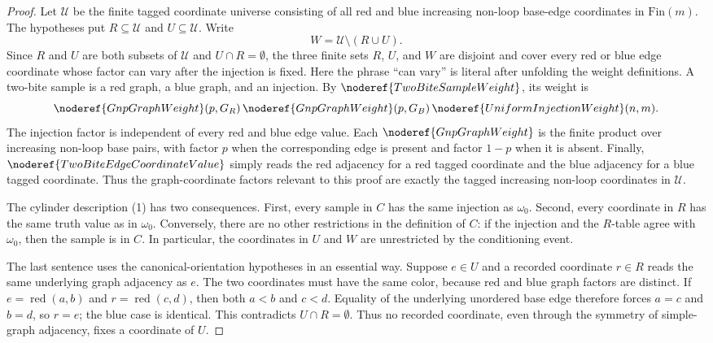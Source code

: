 \begin{proof}
Let \(\mathcal U\) be the finite tagged coordinate universe consisting of all
red and blue increasing non-loop base-edge coordinates in \(\mathrm{Fin}(m)\).
The hypotheses put \(R\subseteq\mathcal U\) and \(U\subseteq\mathcal U\).
Write
\[
W=\mathcal U\setminus(R\cup U).
\]
Since \(R\) and \(U\) are both subsets of \(\mathcal U\) and \(U\cap R=\emptyset\),
the three finite sets \(R\), \(U\), and \(W\) are disjoint and cover every red
or blue edge coordinate whose
 factor can vary after the injection is fixed.
Here the phrase ``can vary'' is literal after unfolding the weight
definitions.  A two-bite sample is a red graph, a blue graph, and an
injection.  By \(\noderef{TwoBiteSampleWeight}\), its weight is
\[
\noderef{GnpGraphWeight}(p,G_R)\,
\noderef{GnpGraphWeight}(p,G_B)\,
\noderef{UniformInjectionWeight}(n,m).
\]
The injection factor is independent of every red and blue edge value.  Each
\(\noderef{GnpGraphWeight}\) is the finite product over increasing non-loop
base pairs, with factor \(p\) when the corresponding edge is present and
factor \(1-p\) when it is absent.  Finally,
\(\noderef{TwoBiteEdgeCoordinateValue}\) simply reads the red adjacency for a
red tagged coordinate and the blue adjacency for a blue tagged coordinate.
Thus the graph-coordinate factors relevant to this proof are exactly the
tagged increasing non-loop coordinates in \(\mathcal U\).

The cylinder description (1) has two consequences.  First, every sample in
\(C\) has the same injection as \(\omega_0\).  Second, every coordinate in
\(R\) has the same truth value as in \(\omega_0\).  Conversely, there are no
other restrictions in the definition of \(C\): if the injection and the
\(R\)-table agree with \(\omega_0\), then the sample is in \(C\).  In
particular, the coordinates in \(U\) and \(W\) are unrestricted by the
conditioning event.

The last sentence uses the canonical-orientation hypotheses in an essential
way.  Suppose \(e\in U\) and a recorded coordinate \(r\in R\) reads the same
underlying graph adjacency as \(e\).  The two coordinates must have the same
color, because red and blue graph factors are distinct.  If
\(e=\operatorname{red}(a,b)\) and \(r=\operatorname{red}(c,d)\), then both
\(a<b\) and \(c<d\).  Equality of the underlying unordered base edge therefore
forces \(a=c\) and \(b=d\), so \(r=e\); the blue case is identical.  This
contradicts \(U\cap R=\emptyset\).  Thus no recorded coordinate, even through
the symmetry of simple-graph adjacency, fixes a coordinate of \(U\).


\end{proof}
